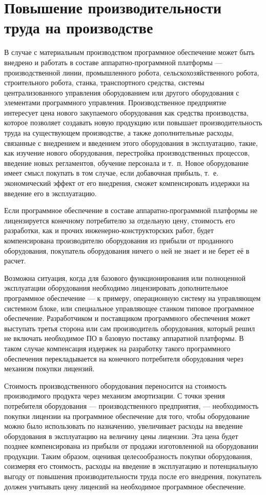 \documentclass{article}
\begin{document}
\section*{Повышение производительности труда на производстве}

В случае с материальным производством программное обеспечение может быть внедрено и работать в составе аппаратно-программной платформы — производственной линии, промышленного робота, сельскохозяйственного робота, строительного робота, станка, транспортного средства, системы централизованного управления оборудованием или другого оборудования с элементами программного управления. Производственное предприятие интересует цена нового закупаемого оборудования как средства производства, которое позволяет создавать новую продукцию или повышает производительность труда на существующем производстве, а также дополнительные расходы, связанные с внедрением и введением этого оборудования в эксплуатацию, такие, как изучение нового оборудования, перестройка производственных процессов, введение новых регламентов, обучение персонала и т.~п. Новое оборудование имеет смысл покупать в том случае, если добавочная прибыль, т.~е. экономический эффект от его внедрения, сможет компенсировать издержки на введение его в эксплуатацию.

Если программное обеспечение в составе аппаратно-программной платформы не лицензируется конечному потребителю за отдельную цену, стоимость его разработки, как и прочих инженерно-конструкторских работ, будет компенсирована производителю оборудования из прибыли от проданного оборудования, покупатель оборудования ничего о ней не знает и не берет её в расчет.

Возможна ситуация, когда для базового функционирования или полноценной эксплуатации оборудования необходимо лицензировать дополнительное программное обеспечение — к примеру, операционную систему на управляющем системном блоке, или специальное управляющее станком типовое программное обеспечение. Разработчиком и поставщиком программного обеспечения может выступать третья сторона или сам производитель оборудования, который решил не включать необходимое ПО в базовую поставку аппаратной платформы. В таком случае компенсация издержек на разработку такого программного обеспечения перекладывается на конечного потребителя оборудования через механизм покупки лицензий.

Стоимость производственного оборудования переносится на стоимость производимого продукта через механизм амортизации. С точки зрения потребителя оборудования — производственного предприятия, — необходимость покупки лицензии на программное обеспечение для того, чтобы оборудование можно было использовать по назначению, увеличивает расходы на введение оборудования в эксплуатацию на величину цены лицензии. Эта цена будет позднее компенсирована из прибыли от продажи изготовленной на оборудовании продукции. Таким образом, оценивая целесообразность покупки оборудования, соизмеряя его стоимость, расходы на введение в эксплуатацию и потенциальную выгоду от повышения производительности труда после его внедрения, покупатель должен учитывать цену лицензий на необходимое программное обеспечение.
\end{document}
